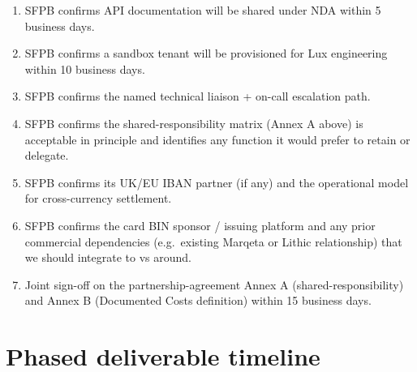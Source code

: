 \documentclass[11pt,letterpaper]{article}
\begin{document}
\begin{enumerate}[leftmargin=1.6em]
  \item SFPB confirms API documentation will be shared under NDA within
        5 business days.
  \item SFPB confirms a sandbox tenant will be provisioned for Lux
        engineering within 10 business days.
  \item SFPB confirms the named technical liaison + on-call escalation
        path.
  \item SFPB confirms the shared-responsibility matrix (Annex A above)
        is acceptable in principle and identifies any function it would
        prefer to retain or delegate.
  \item SFPB confirms its UK/EU IBAN partner (if any) and the
        operational model for cross-currency settlement.
  \item SFPB confirms the card BIN sponsor / issuing platform and any
        prior commercial dependencies (e.g.\ existing Marqeta or Lithic
        relationship) that we should integrate to vs around.
  \item Joint sign-off on the partnership-agreement Annex A
        (shared-responsibility) and Annex B (Documented Costs
        definition) within 15 business days.
\end{enumerate}

\section{Phased deliverable timeline}
\end{document}
